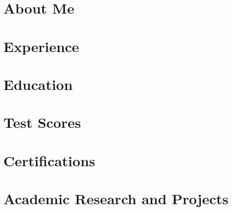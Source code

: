 \documentclass[letterpaper,11pt]{article}
\begin{document}

% 
% 


\section{About Me}
\resumeParagraphStart
    
\resumeParagraphEnd


\section{Experience}
    \resumeSubHeadingListStart  
        
        
        
    \resumeSubHeadingListEnd

\section{Education}
\resumeSubHeadingListStart
    
    
\resumeSubHeadingListEnd

\section{Test Scores}
\resumeSubHeadingListStart
    
    
\resumeSubHeadingListEnd

\section{Certifications}
    \resumeSubHeadingListStart
        
        
        
               
    \resumeSubHeadingListEnd
\section{Academic Research and Projects}
    \resumeSubHeadingListStart
        
        
    \resumeSubHeadingListEnd
\end{document}
